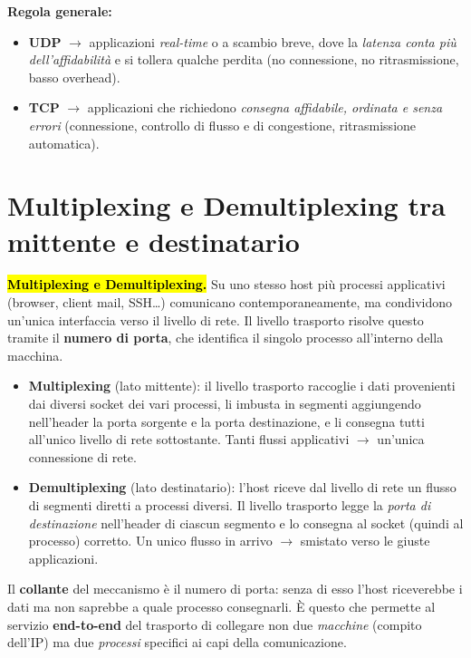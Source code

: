 \documentclass[11pt,a4paper]{report}
\begin{document}
\medskip
\noindent\textbf{Regola generale:}
\begin{itemize}
\item \textbf{UDP} $\to$ applicazioni \emph{real-time} o a scambio breve, dove la \emph{latenza conta pi\`u dell'affidabilit\`a} e si tollera qualche perdita (no connessione, no ritrasmissione, basso overhead).
\item \textbf{TCP} $\to$ applicazioni che richiedono \emph{consegna affidabile, ordinata e senza errori} (connessione, controllo di flusso e di congestione, ritrasmissione automatica).
\end{itemize}

\section{Multiplexing e Demultiplexing tra mittente e destinatario}
\hl{\textbf{Multiplexing e Demultiplexing.}} Su uno stesso host più processi
applicativi (browser, client mail, SSH\dots) comunicano contemporaneamente, ma
condividono un'unica interfaccia verso il livello di rete. Il livello trasporto
risolve questo tramite il \textbf{numero di porta}, che identifica il singolo
processo all'interno della macchina.

\begin{itemize}
    \item \textbf{Multiplexing} (lato mittente): il livello trasporto raccoglie i
    dati provenienti dai diversi socket dei vari processi, li imbusta in segmenti
    aggiungendo nell'header la porta sorgente e la porta destinazione, e li
    consegna tutti all'unico livello di rete sottostante. Tanti flussi
    applicativi $\to$ un'unica connessione di rete.
    \item \textbf{Demultiplexing} (lato destinatario): l'host riceve dal livello
    di rete un flusso di segmenti diretti a processi diversi. Il livello
    trasporto legge la \emph{porta di destinazione} nell'header di ciascun
    segmento e lo consegna al socket (quindi al processo) corretto. Un unico
    flusso in arrivo $\to$ smistato verso le giuste applicazioni.
\end{itemize}

Il \textbf{collante} del meccanismo è il numero di porta: senza di esso l'host
riceverebbe i dati ma non saprebbe a quale processo consegnarli. È questo che
permette al servizio \textbf{end-to-end} del trasporto di collegare non due
\emph{macchine} (compito dell'IP) ma due \emph{processi} specifici ai capi della
comunicazione.
\end{document}
